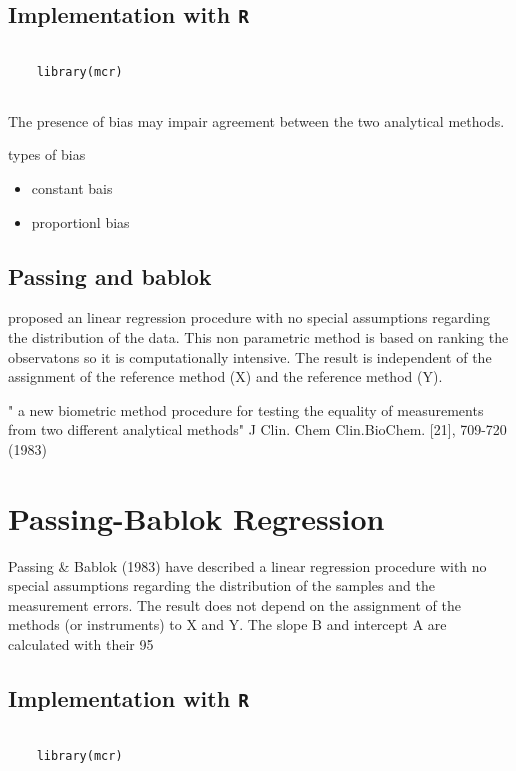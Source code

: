 \subsection{Implementation with \texttt{R}}

\begin{framed}
	\begin{verbatim}
	
	library(mcr)
	
	\end{verbatim}
\end{framed}
The presence of bias may impair agreement between the two analytical methods.

types of bias

\begin{itemize}
	\item constant bais
	\item proportionl bias
\end{itemize}

\subsection{Passing and bablok}
proposed an linear regression procedure with no special assumptions regarding the distribution of the data.
This non parametric method is based on ranking the observatons so it is computationally intensive.
The result is independent of the assignment of the reference method (X) and the reference method (Y).

" a new biometric method procedure for testing the equality of measurements from two different analytical methods"
J Clin. Chem Clin.BioChem. [21], 709-720 (1983)
\section{Passing-Bablok Regression}


Passing & Bablok (1983) have described a linear regression procedure with no special assumptions regarding the distribution of the samples and the measurement errors. The result does not depend on the assignment of the methods (or instruments) to X and Y. The slope B and intercept A are calculated with their 95%

\subsection{Implementation with \texttt{R}}

\begin{framed}
	\begin{verbatim}
	
	library(mcr)
	
	\end{verbatim}
\end{framed}

